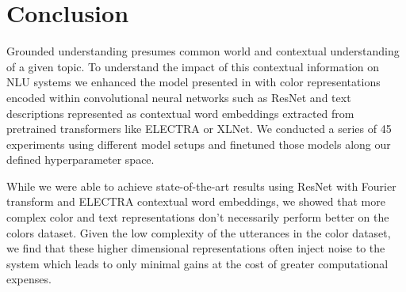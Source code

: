 \section{Conclusion}

Grounded understanding presumes common world and contextual understanding of a given topic. To understand the impact of this contextual information on NLU systems we enhanced the model presented in \citep{monroe-2017-colors} with color representations encoded within convolutional neural networks such as ResNet and text descriptions represented as contextual word embeddings extracted from pretrained transformers like ELECTRA or XLNet. We conducted a series of 45 experiments using different model setups and finetuned those models along our defined hyperparameter space.

\par
While we were able to achieve state-of-the-art results using ResNet with Fourier transform and ELECTRA contextual word embeddings, we showed that more complex color and text representations don’t necessarily perform better on the colors dataset. Given the low complexity of the utterances in the color dataset, we find that these higher dimensional representations often inject noise to the system which leads to only minimal gains at the cost of greater computational expenses.

